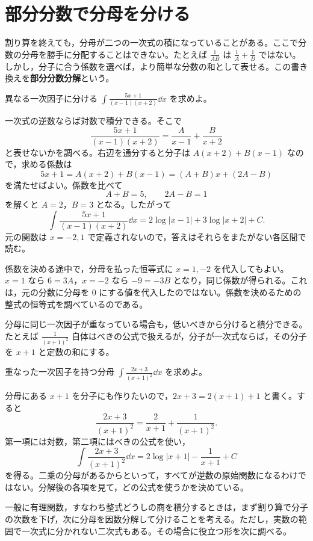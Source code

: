 \section{部分分数で分母を分ける}\label{節:部分分数}

割り算を終えても，分母が二つの一次式の積になっていることがある。ここで分数の分母を勝手に分配することはできない。たとえば $\frac1{AB}$ は $\frac1A+\frac1B$ ではない。しかし，分子に合う係数を選べば，より簡単な分数の和として表せる。この書き換えを\textbf{部分分数分解}という。

\begin{example}{異なる一次因子に分ける}
$\int\frac{5x+1}{(x-1)(x+2)}\dd x$ を求めよ。
\end{example}

一次式の逆数ならば対数で積分できる。そこで
\[
 \frac{5x+1}{(x-1)(x+2)}
 =\frac A{x-1}+\frac B{x+2}
\]
と表せないかを調べる。右辺を通分すると分子は $A(x+2)+B(x-1)$ なので，求める係数は
\[
 5x+1=A(x+2)+B(x-1)
       =(A+B)x+(2A-B)
\]
を満たせばよい。係数を比べて
\[
 A+B=5,\qquad 2A-B=1
\]
を解くと $A=2$，$B=3$ となる。したがって
\[
 \int\frac{5x+1}{(x-1)(x+2)}\dd x
 =2\log|x-1|+3\log|x+2|+C.
\]
元の関数は $x=-2,1$ で定義されないので，答えはそれらをまたがない各区間で読む。

係数を決める途中で，分母を払った恒等式に $x=1,-2$ を代入してもよい。$x=1$ なら $6=3A$，$x=-2$ なら $-9=-3B$ となり，同じ係数が得られる。これは，元の分数に分母を $0$ にする値を代入したのではない。係数を決めるための整式の恒等式を調べているのである。

分母に同じ一次因子が重なっている場合も，低いべきから分けると積分できる。たとえば $\frac1{(x+1)^2}$ 自体はべきの公式で扱えるが，分子が一次式ならば，その分子を $x+1$ と定数の和にする。

\begin{example}{重なった一次因子を持つ分母}
$\int\frac{2x+3}{(x+1)^2}\dd x$ を求めよ。
\end{example}

分母にある $x+1$ を分子にも作りたいので，$2x+3=2(x+1)+1$ と書く。すると
\[
 \frac{2x+3}{(x+1)^2}
 =\frac2{x+1}+\frac1{(x+1)^2}.
\]
第一項には対数，第二項にはべきの公式を使い，
\[
 \int\frac{2x+3}{(x+1)^2}\dd x
 =2\log|x+1|-\frac1{x+1}+C
\]
を得る。二乗の分母があるからといって，すべてが逆数の原始関数になるわけではない。分解後の各項を見て，どの公式を使うかを決めている。

一般に有理関数，すなわち整式どうしの商を積分するときは，まず割り算で分子の次数を下げ，次に分母を因数分解して分けることを考える。ただし，実数の範囲で一次式に分かれない二次式もある。その場合に役立つ形を次に調べる。

